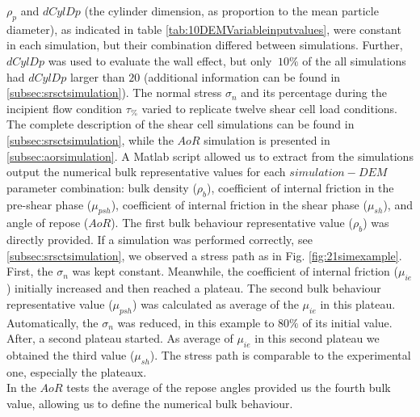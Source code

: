 $\rho_p$ and $dCylDp$ (the cylinder dimension, as proportion to the mean
particle diameter), as indicated in table \ref{tab:10DEMVariableinputvalues}, were constant in each simulation, but their combination differed between
simulations.
Further, $dCylDp$ was used to evaluate the wall effect, but only $~10\%$ of the
all simulations had $dCylDp$ larger than $20$ (additional information can be found in \ref{subsec:srsctsimulation}). 
The normal stress $\sigma_n$ and its
percentage during the incipient flow condition $\tau_{\%}$
varied to replicate twelve shear cell load conditions. 
The complete description of the shear cell simulations can be found in \ref{subsec:srsctsimulation}, 
while the $AoR$ simulation is presented in \ref{subsec:aorsimulation}.
A Matlab script allowed us to extract from the simulations output the numerical
bulk representative values for
each $simulation-DEM$ parameter combination:
bulk density ($\rho_b$),
coefficient of internal friction in the pre-shear phase ($\mu_{psh}$),
coefficient of internal friction in the shear phase ($\mu_{sh}$),
and angle of repose ($AoR$).
The first bulk behaviour representative value ($\rho_b$) was directly provided. 
If a simulation was performed correctly, see \ref{subsec:srsctsimulation}, we
observed a stress path as in Fig. \ref{fig:21simexample}.
First, the $\sigma_n$ was kept constant. 
Meanwhile, the coefficient of internal friction ($\mu_{ie}$) initially increased
and then reached a plateau.
The second bulk behaviour representative value ($\mu_{psh}$) was calculated as average of the $\mu_{ie}$ in this plateau.
Automatically, the $\sigma_n$ was reduced, in this example to $80 \%$ of its
initial value.
After, a second plateau started.
As average of $\mu_{ie}$ in this second plateau we obtained the third value
($\mu_{sh}$).
The stress path is
comparable to the experimental one, especially the plateaux.\\
In the $AoR$ tests the average of the repose angles provided us the fourth bulk
value, allowing us to define the numerical bulk behaviour.





